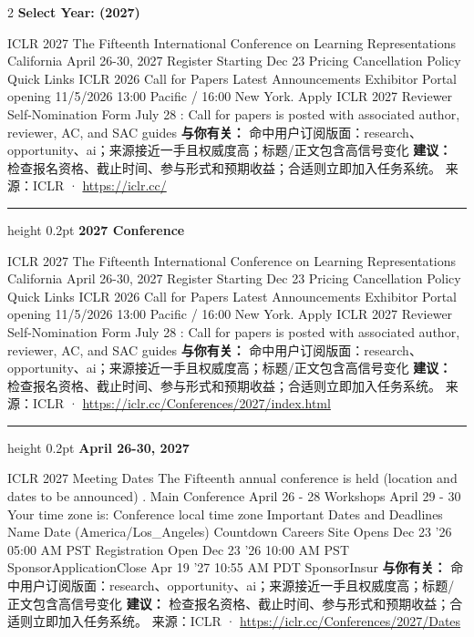 \documentclass[10.5pt]{ctexart}
\begin{document}
\begin{multicols}{2}
{\large\bfseries Select Year: (2027)}\par
ICLR 2027 The Fifteenth International Conference on Learning Representations California April 26-30, 2027 Register Starting Dec 23 Pricing Cancellation Policy Quick Links ICLR 2026 Call for Papers Latest Announcements Exhibitor Portal opening 11/5/2026 13:00 Pacific / 16:00 New York. Apply ICLR 2027 Reviewer Self-Nomination Form July 28 : Call for papers is posted with associated author, reviewer, AC, and SAC guides 
\textbf{与你有关：} 命中用户订阅版面：research、opportunity、ai；来源接近一手且权威度高；标题/正文包含高信号变化
\textbf{建议：} 检查报名资格、截止时间、参与形式和预期收益；合适则立即加入任务系统。
{\footnotesize\color{ormuted} 来源：ICLR · \url{https://iclr.cc/}}
\vspace{2mm}
\hrule height 0.2pt
\vspace{2mm}
{\large\bfseries 2027 Conference}\par
ICLR 2027 The Fifteenth International Conference on Learning Representations California April 26-30, 2027 Register Starting Dec 23 Pricing Cancellation Policy Quick Links ICLR 2026 Call for Papers Latest Announcements Exhibitor Portal opening 11/5/2026 13:00 Pacific / 16:00 New York. Apply ICLR 2027 Reviewer Self-Nomination Form July 28 : Call for papers is posted with associated author, reviewer, AC, and SAC guides 
\textbf{与你有关：} 命中用户订阅版面：research、opportunity、ai；来源接近一手且权威度高；标题/正文包含高信号变化
\textbf{建议：} 检查报名资格、截止时间、参与形式和预期收益；合适则立即加入任务系统。
{\footnotesize\color{ormuted} 来源：ICLR · \url{https://iclr.cc/Conferences/2027/index.html}}
\vspace{2mm}
\hrule height 0.2pt
\vspace{2mm}
{\large\bfseries April 26-30, 2027}\par
ICLR 2027 Meeting Dates The Fifteenth annual conference is held (location and dates to be announced) . Main Conference April 26 - 28 Workshops April 29 - 30 Your time zone is: Conference local time zone Important Dates and Deadlines Name Date (America/Los\_Angeles) Countdown Careers Site Opens Dec 23 '26 05:00 AM PST Registration Open Dec 23 '26 10:00 AM PST SponsorApplicationClose Apr 19 '27 10:55 AM PDT SponsorInsur
\textbf{与你有关：} 命中用户订阅版面：research、opportunity、ai；来源接近一手且权威度高；标题/正文包含高信号变化
\textbf{建议：} 检查报名资格、截止时间、参与形式和预期收益；合适则立即加入任务系统。
{\footnotesize\color{ormuted} 来源：ICLR · \url{https://iclr.cc/Conferences/2027/Dates}}

\end{multicols}
\end{document}
